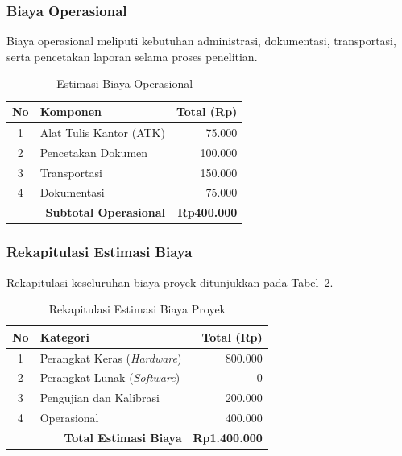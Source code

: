 \documentclass{elsinta}
\begin{document}

\subsubsection{Biaya Operasional}

Biaya operasional meliputi kebutuhan administrasi, dokumentasi, transportasi, serta pencetakan laporan selama proses penelitian.

\begin{table}[H]
\centering
\caption{Estimasi Biaya Operasional}
\label{tab:operasional}
\renewcommand{\arraystretch}{1.3}

\begin{tabular}{|c|p{8cm}|r|}
\hline
\textbf{No} &
\centering\textbf{Komponen} &
\textbf{Total (Rp)}\\
\hline

1 & Alat Tulis Kantor (ATK) & 75.000\\
\hline
2 & Pencetakan Dokumen & 100.000\\
\hline
3 & Transportasi & 150.000\\
\hline
4 & Dokumentasi & 75.000\\
\hline

\multicolumn{2}{|r|}{\textbf{Subtotal Operasional}} &
\textbf{Rp400.000}\\
\hline

\end{tabular}
\end{table}


\subsubsection{Rekapitulasi Estimasi Biaya}

Rekapitulasi keseluruhan biaya proyek ditunjukkan pada Tabel~\ref{tab:rekap_biaya}.

\begin{table}[H]
\centering
\caption{Rekapitulasi Estimasi Biaya Proyek}
\label{tab:rekap_biaya}
\renewcommand{\arraystretch}{1.3}

\begin{tabular}{|c|p{8cm}|r|}
\hline
\textbf{No} &
\centering\textbf{Kategori} &
\textbf{Total (Rp)}\\
\hline

1 & Perangkat Keras (\textit{Hardware}) & 800.000\\
\hline
2 & Perangkat Lunak (\textit{Software}) & 0\\
\hline
3 & Pengujian dan Kalibrasi & 200.000\\
\hline
4 & Operasional & 400.000\\
\hline

\multicolumn{2}{|r|}{\textbf{Total Estimasi Biaya}} &
\textbf{Rp1.400.000}\\
\hline

\end{tabular}
\end{table}
\end{document}
